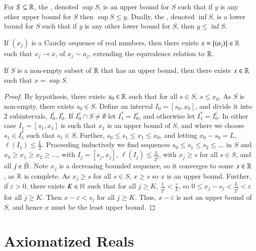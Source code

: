 \begin{defn}
    For $S \subseteq \mathbb R$, the , denoted $\sup S$, is an upper bound for $S$ such that if $y$ is any other upper bound for $S$ then $\sup S \leq y$. Dually, the , denoted $\inf S$, is a lower bound for $S$ such that if $y$ is any other lower bound for $S$, then $y \leq \inf S$.
\end{defn}

\begin{thm}[Completeness of $\R$]
    If $(x_j)$ is a Cauchy sequence of real numbers, then there exists $x = [(a_j)] \in \mathbb R$ such that $x_j \rightarrow x$, of $x_j \sim a_j$, extending the equivalence relation to $\R$.
\end{thm}


\begin{prop}\label{prop:1.6.12}
    If $S$ is a non-empty subset of $\R$ that has an upper bound, then there exists $x \in \mathbb R$ such that $x = \sup S$.
\end{prop}
\begin{proof}
    By hypothesis, there exists $x_0 \in \mathbb R$ such that for all $s \in S$, $s \leq x_0$. As $S$ is non-empty, there exists $s_0 \in S$. Define an interval $I_0 = [s_0,x_0]$, and divide it into $2$ subintervals, $I_0^l,I_0^r$. If $I_0^r\cap S \neq \emptyset$ let $I_1^* = I_0^r$, and otherwise let $I_1^* = I_0^l$. In either case $I_1 = [s_1,x_1]$ is such that $x_1$ is an upper bound of $S$, and where we choose $s_1 \in I_1^*$ such that $s_1 \in S$. Further, $s_0 \leq s_1 \leq x_1 \leq x_0$, and letting $x_0 - s_0 = L$, $\ell(I_1) \leq \frac{L}{2}$. Proceeding inductively we find sequences $s_0\leq s_1\leq s_2 \leq ...$ in $S$ and $x_0 \geq x_1 \geq x_2 \geq ...$, with $I_j = [s_j,x_j]$, $\ell(I_j) \leq \frac{L}{2^j}$, with $x_j \geq s$ for all $s \in S$, and all $j \in \tilde{\mathbb N}$. Note $x_j$ is a decreasing bounded sequence, so it converges to some $x \in \mathbb R$, as $\R$ is complete. As $x_j \geq s$ for all $s \in S$, $x \geq s$ so $x$ is an upper bound. Further, if $\varepsilon > 0$, there exists $K \in \mathbb N$ such that for all $j \geq K$, $\frac{1}{2^j} < \frac{\varepsilon}{L}$, so $0 \leq x_j - s_j < \frac{L}{2^j} < \varepsilon$ for all $j \geq K$. Then $x-\varepsilon < s_j$ for all $j \geq K$. Thus, $x-\varepsilon$ is not an upper bound of $S$, and hence $x$ must be the least upper bound.
\end{proof}


\section{Axiomatized Reals}

